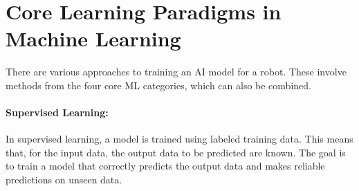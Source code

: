 




\section{Core Learning Paradigms in Machine Learning}
There are various approaches to training an \ac{AI} model for a robot. These involve methods from the four core \ac{ML} categories, which can also be combined.

\paragraph{Supervised Learning:}

In supervised learning, a model is trained using labeled training data. This means that, for the input data, the output data to be predicted are known. The goal is to train a model that correctly predicts the output data and makes reliable predictions on unseen data. 



